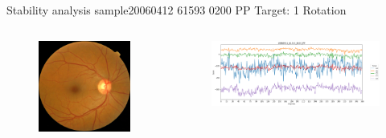\documentclass{beamer}
\begin{document}
\begin{frame}{Stability analysis sample}{20060412 61593 0200 PP Target: 1 Rotation}
\begin{columns}
\begin{column}{0.3\textwidth}
\begin{figure}[p]
\centering
\includegraphics[width=\textwidth]{chapter_stability/20060412_61593_0200_PP/20060412_61593_0200_PP.jpeg}
\end{figure}	
\end{column}
\begin{column}{0.45\textwidth}  %
\begin{figure}[p]
\centering
\includegraphics[width=\textwidth]{chapter_stability/20060412_61593_0200_PP/r/scores.png}
\end{figure}
\centering
\href{run:videos_stability/Messidor_20060412_61593_0200_PP_Target_1_Checking_Rotation_Sensitivity.mp4}{\color{blue}{Rotation Visualization}} 
\end{column}
\end{columns}
\end{frame}
\end{document}

